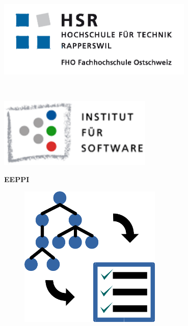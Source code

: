 \begin{titlepage}
	\begin{minipage}{0.5\textwidth}
		\begin{flushleft} \large
			\includegraphics[width=0.7\textwidth]{media/img/logoHSR.png}
		\end{flushleft}
	\end{minipage}
	~
	\begin{minipage}{0.45\textwidth}
		\begin{flushright} \large
			\includegraphics[width=0.55\textwidth]{media/img/ifsLogo.png}
		\end{flushright}
	\end{minipage}
	
	\vspace*{2cm}
	\begin{center}
		{\fontsize{50}{40} \selectfont \textbf{EEPPI} \\[10mm]}
	
		\begin{figure}[H]
			\centering
			\includegraphics[scale=0.40]{media/img/eeppiLogo.png}
		\end{figure}		
		\vspace*{0.5cm}	
	

\end{center}
\end{titlepage}
